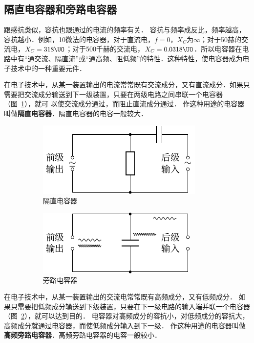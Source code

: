 \subsection{隔直电容器和旁路电容器}

跟感抗类似，容抗也跟通过的电流的频率有关．
容抗与频率成反比，频率越高，容抗越小．例如，10微法的电容器，对于直流电，$f=0$，$X_C$为$\infty$；对于50赫的交流电，$X_C=318\UO$；对于500千赫的交流电，$X_C=0.0318\UO$．所以电容器在电路中有“通交流、隔直流”或“通高频、阻低频”的特性．这种特性，使电容器成为电子技术中的一种重要元件．

在电子技术中，从某一装置输出的电流常常既有交流成分，又有直流成分．如果只需要把交流成分输送到下一级装置，只要在两级电路之间串联一个电容器（图~\ref{fig_C_3-19a}），就可
以使交流成分通过，而阻止直流成分通过．
作这种用途的电容器叫做\textbf{隔直电容器}．隔直电容器的电容一般较大．
\begin{figure}[htbp]
    \centering
    \begin{subfigure}{0.4\linewidth}
        \centering
        \includegraphics{fig/C/3-19a.pdf}
        \caption{隔直电容器}\label{fig_C_3-19a}
    \end{subfigure}
    \hfil
    \begin{subfigure}{0.4\linewidth}
        \centering
        \includegraphics{fig/C/3-19b.pdf}
        \caption{旁路电容器}\label{fig_C_3-19b}
    \end{subfigure}
    \caption{}\label{fig_C_3-19}
\end{figure}

在电子技术中，从某一装置输出的交流电常常既有高频成分，又有低频成分．
如果只需要把低频成分输送到下级装置，只要在下一级电路的输入端并联一个电容器（图~\ref{fig_C_3-19b}），就可以达到目的．
电容器对高频成分的容抗小，对低频成分的容抗大，高频成分就通过电容器，而使低频成分输入到下一级．
作这种用途的电容器叫做\textbf{高频旁路电容器}．高频旁路电容器的电容一般较小．

